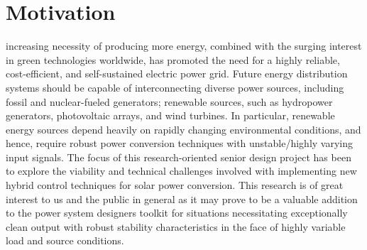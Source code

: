 \section{Motivation}

 increasing necessity of producing more energy, combined with the surging
interest in green technologies worldwide, has promoted the need for a highly
reliable, cost-efficient, and self-sustained electric power grid. Future energy distribution
systems should be capable of interconnecting diverse power sources,
including fossil and nuclear-fueled generators; renewable sources, such as hydropower
generators, photovoltaic arrays, and wind turbines. In particular, renewable energy sources depend heavily on
rapidly changing environmental conditions, and hence, require robust power conversion techniques with unstable/highly varying input signals\cite{91}. The focus of this research-oriented senior design project has been to explore the viability and technical challenges involved with implementing new hybrid control techniques for solar power conversion. This research is of great interest to us and the public in general as it may prove to be a valuable addition to the power system designers toolkit for situations necessitating exceptionally clean output with robust stability characteristics in the face of highly variable load and source conditions.